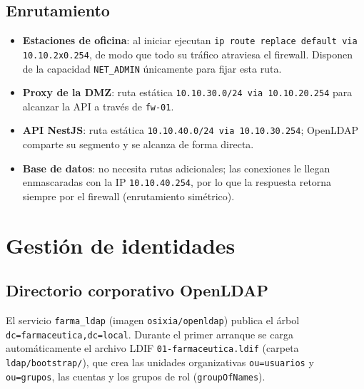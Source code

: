\documentclass[11pt,a4paper,oneside]{report}
\newcommand{\cod}[1]{\texttt{\small #1}}
\begin{document}
\section{Enrutamiento}

\begin{itemize}
  \item \textbf{Estaciones de oficina}: al iniciar ejecutan \cod{ip route replace default via
  10.10.2x0.254}, de modo que todo su tráfico atraviesa el firewall. Disponen de la
  capacidad \cod{NET\_ADMIN} únicamente para fijar esta ruta.
  \item \textbf{Proxy de la DMZ}: ruta estática \cod{10.10.30.0/24 via 10.10.20.254} para
  alcanzar la API a través de \cod{fw-01}.
  \item \textbf{API NestJS}: ruta estática \cod{10.10.40.0/24 via 10.10.30.254}; OpenLDAP
  comparte su segmento y se alcanza de forma directa.
  \item \textbf{Base de datos}: no necesita rutas adicionales; las conexiones le llegan
  enmascaradas con la IP \cod{10.10.40.254}, por lo que la respuesta retorna siempre por
  el firewall (enrutamiento simétrico).
\end{itemize}

\chapter{Gestión de identidades}

\section{Directorio corporativo OpenLDAP}

El servicio \cod{farma\_ldap} (imagen \cod{osixia/openldap}) publica el árbol
\cod{dc=farmaceutica,dc=local}. Durante el primer arranque se carga automáticamente el
archivo LDIF \cod{01-farmaceutica.ldif} (carpeta \cod{ldap/bootstrap/}), que crea las unidades organizativas
\cod{ou=usuarios} y \cod{ou=grupos}, las cuentas y los grupos de rol (\cod{groupOfNames}).
\end{document}
